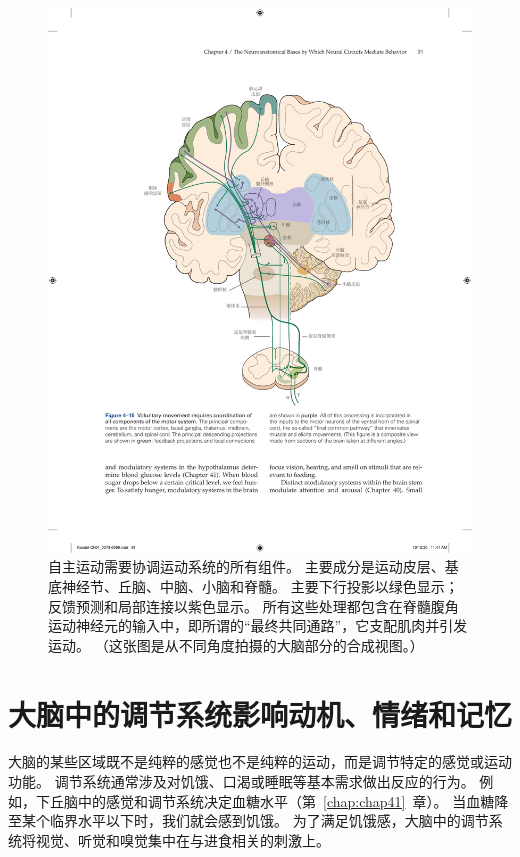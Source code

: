 \begin{figure}[htbp]
	\centering
	\includegraphics[width=1.0\linewidth]{chap04/fig_4_15}
	\caption{自主运动需要协调运动系统的所有组件。
		主要成分是运动皮层、基底神经节、丘脑、中脑、小脑和脊髓。
		主要下行投影以绿色显示；
		反馈预测和局部连接以紫色显示。
		所有这些处理都包含在脊髓腹角运动神经元的输入中，即所谓的“最终共同通路”，它支配肌肉并引发运动。
		（这张图是从不同角度拍摄的大脑部分的合成视图。）}
	\label{fig:4_15}
\end{figure}



\section{大脑中的调节系统影响动机、情绪和记忆}

大脑的某些区域既不是纯粹的感觉也不是纯粹的运动，而是调节特定的感觉或运动功能。 
调节系统通常涉及对饥饿、口渴或睡眠等基本需求做出反应的行为。 
例如，下丘脑中的感觉和调节系统决定血糖水平（第~\ref{chap:chap41}~章）。 
当血糖降至某个临界水平以下时，我们就会感到饥饿。 
为了满足饥饿感，大脑中的调节系统将视觉、听觉和嗅觉集中在与进食相关的刺激上。


